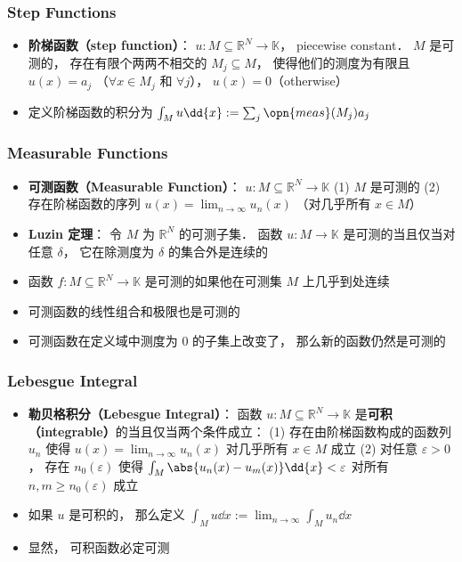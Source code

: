 \subsubsection{Step Functions}
\begin{itemize}
\item \textbf{阶梯函数（step function）}： $u:M\subseteq\mathbb R^N \to\mathbb K$， piecewise constant． $M$ 是可测的， 存在有限个两两不相交的 $M_j \subseteq M$， 使得他们的测度为有限且 $u(x) = a_j$ （$\forall x\in M_j$ 和 $\forall j$）， $u(x) = 0$（otherwise）

\item 定义阶梯函数的积分为 $\int_M u\dd{x} := \sum_j \opn{meas}(M_j)a_j$
\end{itemize}

\subsubsection{Measurable Functions}
\begin{itemize}
\item \textbf{可测函数（Measurable Function）}： $u: M\subseteq\mathbb R^N \to\mathbb K$ (1) $M$ 是可测的 (2) 存在阶梯函数的序列 $u(x) = \lim_{n\to\infty} u_n(x)$ （对几乎所有 $x\in M$）

\item \textbf{Luzin 定理}： 令 $M$ 为 $\mathbb R^N$ 的可测子集． 函数 $u: M\to\mathbb K$ 是可测的当且仅当对任意 $\delta$， 它在除测度为 $\delta$ 的集合外是连续的

\item 函数 $f:M\subseteq\mathbb R^N \to \mathbb K$ 是可测的如果他在可测集 $M$ 上几乎到处连续

\item 可测函数的线性组合和极限也是可测的

\item 可测函数在定义域中测度为 0 的子集上改变了， 那么新的函数仍然是可测的
\end{itemize}

\subsubsection{Lebesgue Integral}
\begin{itemize}
\item \textbf{勒贝格积分（Lebesgue Integral）}： 函数 $u :M\subseteq\mathbb R^N\to\mathbb K$ 是\textbf{可积（integrable）}的当且仅当两个条件成立： (1) 存在由阶梯函数构成的函数列 $u_n$ 使得 $u(x) = \lim_{n\to\infty} u_n(x)$ 对几乎所有 $x\in M$ 成立 (2) 对任意 $\varepsilon> 0$， 存在 $n_0(\varepsilon)$ 使得 $\int_M \abs{u_n(x) - u_m(x)} \dd{x} < \varepsilon$ 对所有 $n, m\ge n_0(\varepsilon)$ 成立

\item 如果 $u$ 是可积的， 那么定义 $\int_M u\dd{x} := \lim_{n\to\infty} \int_{M} u_n \dd{x}$

\item 显然， 可积函数必定可测
\end{itemize}
